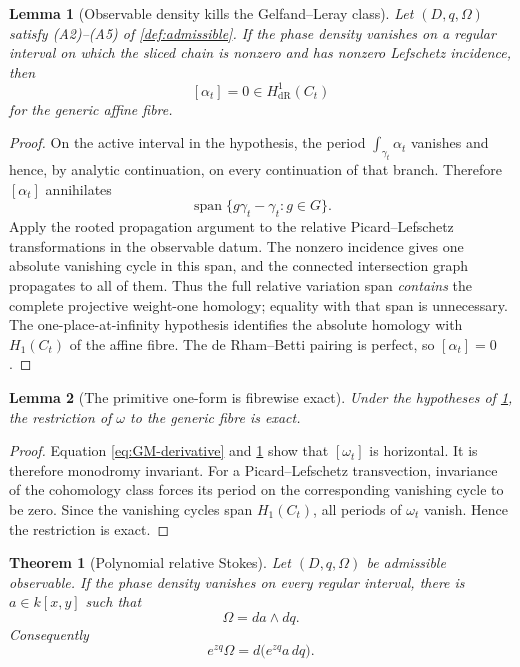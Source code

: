 \documentclass[11pt]{article}
\numberwithin{equation}{section}
\newtheorem{theorem}{Theorem}[section]
\newtheorem{lemma}[lemma]{Lemma}
\theoremstyle{definition}
\theoremstyle{remark}
\newcommand{\Span}{\operatorname{span}}
\begin{document}
\begin{lemma}[Observable density kills the Gelfand--Leray class]
\label{lem:kill-alpha}
Let $(D,q,\Omega)$ satisfy \textup{(A2)--(A5)} of
\cref{def:admissible}.  If the phase density vanishes on a regular interval
on which the sliced chain is nonzero and has nonzero Lefschetz incidence, then
\[
  [\alpha_t]=0\in H^1_{\mathrm{dR}}(C_t)
\]
for the generic affine fibre.
\end{lemma}

\begin{proof}
On the active interval in the hypothesis, the period
$\int_{\gamma_t}\alpha_t$ vanishes and hence, by analytic continuation,
on every continuation of that branch.  Therefore
$[\alpha_t]$ annihilates
\[
  \Span\{g\gamma_t-\gamma_t:g\in G\}.
\]
Apply the rooted propagation argument to the relative
Picard--Lefschetz transformations in the observable datum. The nonzero
incidence gives one absolute vanishing cycle in this span, and the
connected intersection graph propagates to all of them. Thus the full
relative variation span \emph{contains} the complete projective weight-one
homology; equality with that span is unnecessary. The
one-place-at-infinity hypothesis identifies the absolute homology with
$H_1(C_t)$ of the affine fibre.  The de Rham--Betti pairing is perfect,
so $[\alpha_t]=0$.
\end{proof}

\begin{lemma}[The primitive one-form is fibrewise exact]\label{lem:omega-exact}
Under the hypotheses of \cref{lem:kill-alpha}, the restriction of $\omega$ to
the generic fibre is exact.
\end{lemma}

\begin{proof}
Equation \eqref{eq:GM-derivative} and \cref{lem:kill-alpha} show that
$[\omega_t]$ is horizontal.  It is therefore monodromy invariant.  For a
Picard--Lefschetz transvection, invariance of the cohomology class forces its
period on the corresponding vanishing cycle to be zero.  Since the vanishing
cycles span $H_1(C_t)$, all periods of $\omega_t$ vanish.  Hence the
restriction is exact.
\end{proof}

\begin{theorem}[Polynomial relative Stokes]\label{thm:polynomial-relative-Stokes}
Let $(D,q,\Omega)$ be admissible observable.  If the phase density vanishes on
every regular interval, there is $a\in k[x,y]$ such that
\begin{equation}\label{eq:Omega-a}
  \Omega=da\wedge dq.
\end{equation}
Consequently
\begin{equation}\label{eq:twisted-primitive}
  e^{zq}\Omega=d\bigl(e^{zq}a\,dq\bigr).
\end{equation}
\end{theorem}
\end{document}
